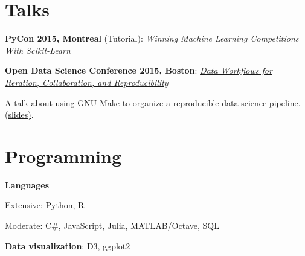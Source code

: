 \documentclass[letterpaper]{resume}
\begin{document}
\section{Talks}

\begin{compactitem}
\item \textbf{PyCon 2015, Montreal} (Tutorial): \textit{Winning Machine Learning Competitions With Scikit-Learn}
\item \textbf{Open Data Science Conference 2015, Boston}: \textit{\href{http://opendatascicon.com/schedule/data-workflows-for-iteration-collaboration-and-reproducibility/}{Data Workflows for Iteration, Collaboration, and Reproducibility}}
\begin{compactitem}
\item A talk about using GNU Make to organize a reproducible data science pipeline. \href{http://www.davidchudzicki.com/slides/odsc-2015-workflow/}{(slides)}.
\end{compactitem}
\end{compactitem}




\section{Programming}
\vspace{1pt}
\begin{compactitem}
\item \textbf{Languages} 
\begin{compactitem}
\item Extensive: Python, R
\item Moderate: C\#, JavaScript, Julia, MATLAB/Octave, SQL
\end{compactitem}
\item \textbf{Data visualization}: D3, ggplot2
\end{compactitem}
\end{document}
